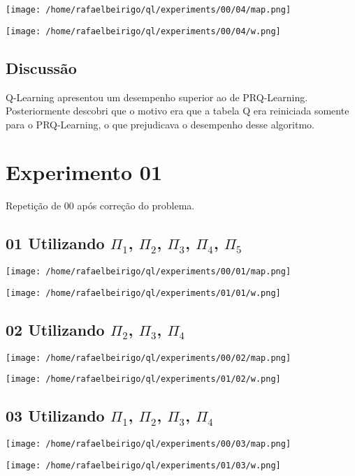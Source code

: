 \documentclass[11pt]{article}
\begin{document}
\centerline{\texttt{[image: /home/rafaelbeirigo/ql/experiments/00/04/map.png]}}


\centerline{\texttt{[image: /home/rafaelbeirigo/ql/experiments/00/04/w.png]}}


\subsection{Discussão}
\label{sec-1.5}

Q-Learning apresentou um desempenho superior ao de PRQ-Learning.
Posteriormente descobri que o motivo era que a tabela Q era reiniciada somente para o 
PRQ-Learning, o que prejudicava o desempenho desse algoritmo.


\section{Experimento 01}
\label{sec-2}

Repetição de 00 após correção do problema.
\subsection{01 Utilizando $\Pi$$_1$, $\Pi$$_2$, $\Pi$$_3$, $\Pi$$_4$, $\Pi$$_5$}
\label{sec-2.1}

\centerline{\texttt{[image: /home/rafaelbeirigo/ql/experiments/00/01/map.png]}}


\centerline{\texttt{[image: /home/rafaelbeirigo/ql/experiments/01/01/w.png]}}


\subsection{02 Utilizando $\Pi$$_2$, $\Pi$$_3$, $\Pi$$_4$}
\label{sec-2.2}

\centerline{\texttt{[image: /home/rafaelbeirigo/ql/experiments/00/02/map.png]}}


\centerline{\texttt{[image: /home/rafaelbeirigo/ql/experiments/01/02/w.png]}}


\subsection{03 Utilizando $\Pi$$_1$, $\Pi$$_2$, $\Pi$$_3$, $\Pi$$_4$}
\label{sec-2.3}

\centerline{\texttt{[image: /home/rafaelbeirigo/ql/experiments/00/03/map.png]}}


\centerline{\texttt{[image: /home/rafaelbeirigo/ql/experiments/01/03/w.png]}}
\end{document}
